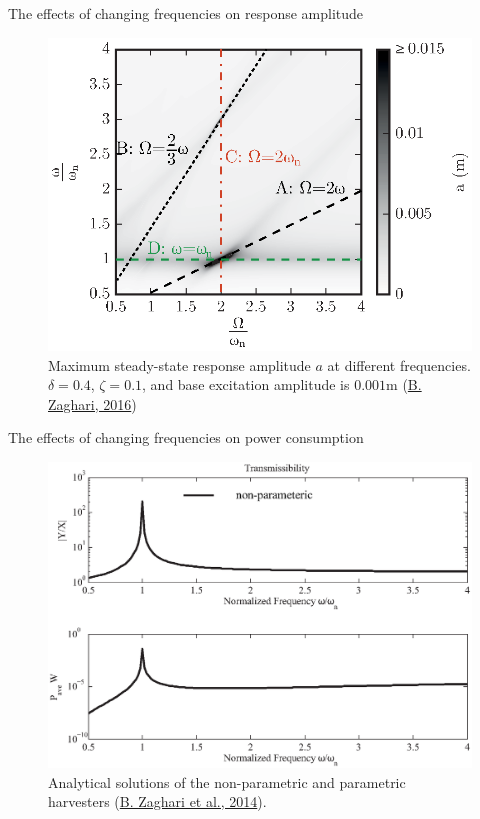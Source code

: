 \documentclass[LaTeX2e,10pt]{beamer}
\begin{document}
\begin{frame}{The effects of changing frequencies on response amplitude}
\begin{figure}
\includegraphics[width=0.7\linewidth]{Images/HighDamping_Amplitude_5.eps}
\caption{Maximum steady-state response amplitude $a$ at different frequencies. $\delta = 0.4$, $\zeta = 0.1$, and base excitation amplitude is $0.001$m (\href{https://eprints.soton.ac.uk/411397/1/BaharehZaghariPhDThesis.pdf}{B. Zaghari, 2016})}  
\end{figure}
\end{frame}
\begin{frame}{The effects of changing frequencies on power consumption}

\begin{figure}
\includegraphics[width=\linewidth]{Images/Fig9EuroDyn1.eps}
\caption{Analytical solutions of the non-parametric and parametric harvesters (\href{https://eprints.soton.ac.uk/366807/}{B. Zaghari et al., 2014}).} 
\end{figure}
\end{frame}
\end{document}
